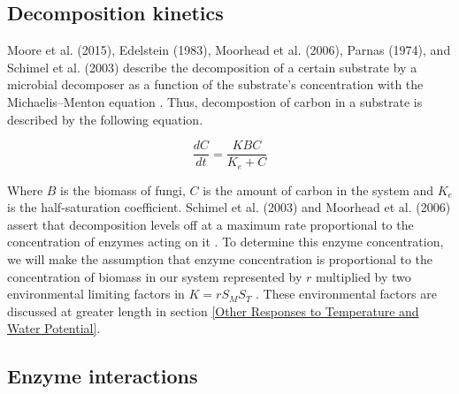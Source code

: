 \documentclass[12pt]{article}
\begin{document}
\begin{multicols}{2}
\subsection{Decomposition kinetics}
Moore et al. (2015), Edelstein (1983), Moorhead et al. (2006), Parnas (1974), and Schimel et al. (2003) describe the decomposition of a certain substrate by a microbial decomposer as a function of the substrate's concentration with the Michaelis–Menton equation \cite{Moore2015, Edelstein1983, Moorhead2006, Parnas1975, Schimel2003}. Thus, decompostion of carbon in a substrate is described by the following equation.

\begin{equation} \label{eq:3}
\frac{dC}{dt} = \frac{KBC}{K_{e}+C}
\end{equation}

Where $B$ is the biomass of fungi, $C$ is the amount of carbon in the system and $K_{e}$ is the half-saturation coefficient. Schimel et al. (2003) and Moorhead et al. (2006) assert that decomposition levels off at a maximum rate proportional to the concentration of enzymes acting on it \cite{Schimel2003, Moorhead2006}. To determine this enzyme concentration, we will make the assumption that enzyme concentration is proportional to the concentration of biomass in our system represented by $r$ multiplied by two environmental limiting factors in $K=rS_{M}S_{T}$ \cite{Schimel2003}. These environmental factors are discussed at greater length in section \ref{Other Responses to Temperature and Water Potential}.

\subsection{Enzyme interactions}


\end{multicols}
\end{document}
